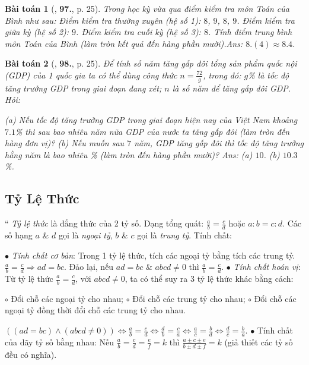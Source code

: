 \documentclass{article}
\newtheorem{baitoan}{Bài toán}
\begin{document}
\begin{baitoan}[\cite{Tuyen_Toan_7}, \textbf{97.}, p. 25]
	Trong học kỳ vừa qua điểm kiểm tra môn Toán của Bình như sau: Điểm kiểm tra thường xuyên (hệ số 1): $8$, $9$, $8$, $9$. Điểm kiểm tra giữa kỳ (hệ số 2): $9$. Điểm kiểm tra cuối kỳ (hệ số 3): $8$. Tính điểm trung bình môn Toán của Bình (làm tròn kết quả đến hàng phần mười).\hfill{\sf Ans:} $8.(4)\approx8.4$.
\end{baitoan}

\begin{baitoan}[\cite{Tuyen_Toan_7}, \textbf{98.}, p. 25]
	Để tính số năm tăng gấp đôi tổng sản phẩm quốc nội (GDP) của 1 quốc gia ta có thể dùng công thức $n = \frac{72}{g}$, trong đó: $g$\% là \emph{tốc độ tăng trưởng GDP} trong giai đoạn đang xét; $n$ là số năm để tăng gấp đôi GDP. Hỏi:
	
		(a) Nếu tốc độ tăng trưởng GDP trong giai đoạn hiện nay của Việt Nam khoảng $7.1$\% thì sau bao nhiêu năm nữa GDP của nước ta tăng gấp đôi (làm tròn đến hàng đơn vị)?
		(b) Nếu muốn sau $7$ năm, GDP tăng gấp đôi thì tốc độ tăng trưởng hằng năm là bao nhiêu \% (làm tròn đến hàng phần mười)?
	\hfill{\sf Ans:} (a) $10$. (b) $10.3$\%.
\end{baitoan}


\subsection{Tỷ Lệ Thức}
``
	 \textit{Tỷ lệ thức} là đẳng thức của 2 tỷ số. Dạng tổng quát: $\frac{a}{b} = \frac{c}{d}$ hoặc $a:b = c:d$. Các số hạng $a$ \& $d$ gọi là \textit{ngoại tỷ}, $b$ \& $c$ gọi là \textit{trung tỷ}.
	 Tính chất:
	
		$\bullet$ \textit{Tính chất cơ bản}: Trong 1 tỷ lệ thức, tích các ngoại tỷ bằng tích các trung tỷ. $\frac{a}{b} = \frac{c}{d}\Rightarrow ad = bc$. Đảo lại, nếu $ad = bc$ \& $abcd\ne 0$ thì $\frac{a}{b} = \frac{c}{d}$.
		$\bullet$ \textit{Tính chất hoán vị}: Từ tỷ lệ thức $\frac{a}{b} = \frac{c}{d}$, với $abcd\ne 0$, ta có thể suy ra 3 tỷ lệ thức khác bằng cách:
		
			$\circ$ Đổi chỗ các ngoại tỷ cho nhau;
			$\circ$ Đổi chỗ các trung tỷ cho nhau;
			$\circ$ Đổi chỗ các ngoại tỷ đồng thời đổi chỗ các trung tỷ cho nhau.
		
		$((ad = bc)\land(abcd\ne 0))\Leftrightarrow\frac{a}{b} = \frac{c}{d}\Leftrightarrow\frac{d}{b} = \frac{c}{a}\Leftrightarrow\frac{a}{c} = \frac{b}{d}\Leftrightarrow\frac{d}{c} = \frac{b}{a}$.
		$\bullet$ Tính chất của dãy tỷ số bằng nhau: Nếu $\frac{a}{b} = \frac{c}{d} = \frac{e}{f} = k$ thì $\frac{a\pm c\pm e}{b\pm d\pm f} = k$ (giả thiết các tỷ số đều có nghĩa).
	
\end{document}
